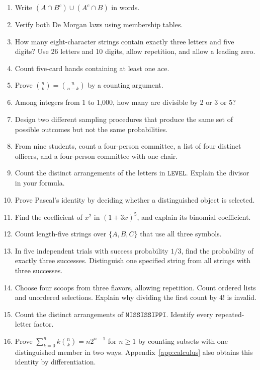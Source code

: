 \begin{exercisebox}
\begin{enumerate}
  \item Write $(A\cap B^c)\cup(A^c\cap B)$ in words. 
  \item Verify both De Morgan laws using membership tables. 
  \item How many eight-character strings contain exactly three letters and five digits? Use 26 letters and 10 digits, allow repetition, and allow a leading zero. 
  \item Count five-card hands containing at least one ace. 
  \item Prove $\binom nk=\binom n{n-k}$ by a counting argument. 
  \item Among integers from 1 to 1,000, how many are divisible by 2 or 3 or 5? 
  \item Design two different sampling procedures that produce the same set of possible outcomes but not the same probabilities. 
  \item From nine students, count a four-person committee, a list of four distinct officers, and a four-person committee with one chair. 
  \item Count the distinct arrangements of the letters in $\texttt{LEVEL}$. Explain the divisor in your formula. 
  \item Prove Pascal's identity by deciding whether a distinguished object is selected. 
  \item Find the coefficient of $x^2$ in $(1+3x)^5$, and explain its binomial coefficient. 
  \item Count length-five strings over $\{A,B,C\}$ that use all three symbols. 
  \item In five independent trials with success probability $1/3$, find
  the probability of exactly three successes. Distinguish one specified
  string from all strings with three successes. 
  \item Choose four scoops from three flavors, allowing repetition.
  Count ordered lists and unordered selections. Explain why dividing
  the first count by $4!$ is invalid. 
  \item Count the distinct arrangements of $\texttt{MISSISSIPPI}$.
  Identify every repeated-letter factor. 
  \item Prove $\sum_{k=0}^n k\binom nk=n2^{n-1}$ for $n\ge1$ by
  counting subsets with one distinguished member in two ways.
  Appendix~\ref{app:calculus} also obtains this identity by differentiation.
\end{enumerate}
\end{exercisebox}
